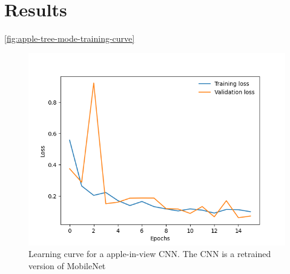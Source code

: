 \section{Results}
\autoref{fig:apple-tree-mode-training-curve}
\begin{figure}[!htb]
    \centering
    \includegraphics[width=\columnwidth,keepaspectratio]
    {./figures/mobile_model_apple_trees_16its_2022-11-15_training_curve}
    \caption{
        Learning curve for a apple-in-view CNN.
        The CNN is a retrained version of MobileNet~\cite{Sandler2018,PyTorchMobileNet}
    }
    \label{fig:apple-tree-mode-training-curve}
\end{figure}
